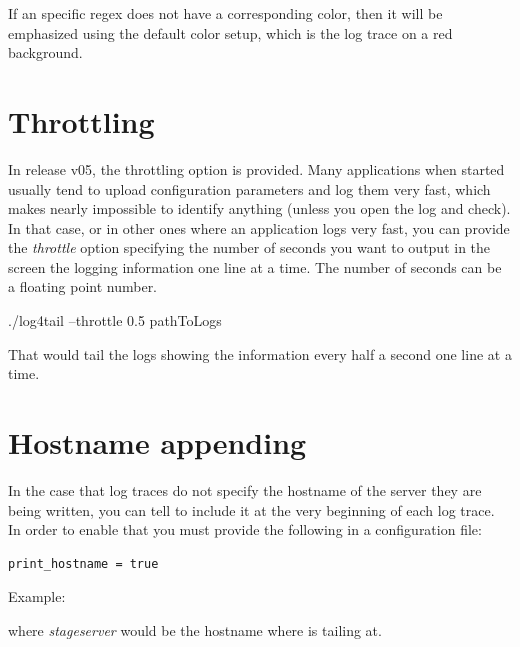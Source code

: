 If an specific regex does not have a corresponding color, then it will be
emphasized using the default color setup, which is the log trace on a red
background.

\section{Throttling}
In release v05, the throttling option is provided. Many applications when
started usually tend to upload configuration parameters and log them very fast,
which makes nearly impossible to identify anything (unless you open the log and
check). In that case, or in other ones where an application logs very fast, you
can provide the \emph{throttle} option specifying the number of seconds you want
to output in the screen the logging information one line at a time. The number 
of seconds can be a floating point number.
\begin{cmd}
 ./log4tail --throttle 0.5 pathToLogs
\end{cmd}
That would tail the logs showing the information every half a second one line at
a time.

\section{Hostname appending}
In the case that log traces do not specify the hostname of the server they are
being written, you can tell \logftailer{} to include it at the very beginning
of each log trace. In order to enable that you must provide the following in a
configuration file:

\begin{config}
\begin{verbatim}
print_hostname = true
\end{verbatim}
\end{config}

Example:\\

where \emph{stageserver} would be the hostname where \logftailer{} is tailing
at. 

